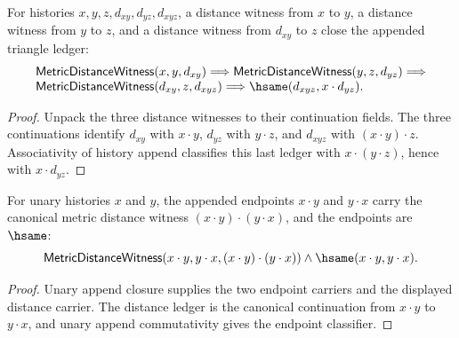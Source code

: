 \begin{theorem}
\label{thm:metric-distance-witness-triangle-append-closed}
For histories $x,y,z,d_{xy},d_{yz},d_{xyz}$, a distance witness from $x$ to
$y$, a distance witness from $y$ to $z$, and a distance witness from $d_{xy}$ to
$z$ close the appended triangle ledger:
$$
\begin{array}{l}
\mathsf{MetricDistanceWitness}(x,y,d_{xy})\Longrightarrow
\mathsf{MetricDistanceWitness}(y,z,d_{yz})\Longrightarrow
\\
\mathsf{MetricDistanceWitness}(d_{xy},z,d_{xyz})\Longrightarrow
\hsame(d_{xyz},x\cdot d_{yz}).
\end{array}
$$
\end{theorem}
\begin{proof}
Unpack the three distance witnesses to their continuation fields. The three
continuations identify $d_{xy}$ with $x\cdot y$, $d_{yz}$ with $y\cdot z$, and
$d_{xyz}$ with $(x\cdot y)\cdot z$. Associativity of history append classifies
this last ledger with $x\cdot (y\cdot z)$, hence with $x\cdot d_{yz}$.
\end{proof}

\begin{theorem}
\label{thm:metric-distance-witness-unary-append-comm-package}
For unary histories $x$ and $y$, the appended endpoints $x\cdot y$ and
$y\cdot x$ carry the canonical metric distance witness
$(x\cdot y)\cdot(y\cdot x)$, and the endpoints are $\hsame$:
$$
\mathsf{MetricDistanceWitness}(x\cdot y,y\cdot x,(x\cdot y)\cdot(y\cdot x))
\land \hsame(x\cdot y,y\cdot x).
$$
\end{theorem}
\begin{proof}
Unary append closure supplies the two endpoint carriers and the displayed
distance carrier. The distance ledger is the canonical continuation from
$x\cdot y$ to $y\cdot x$, and unary append commutativity gives the endpoint
classifier.
\end{proof}

